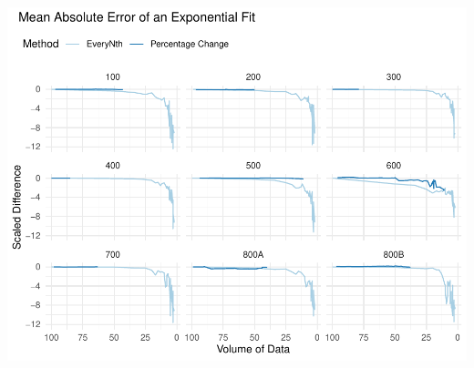 \documentclass{article}
\begin{document}
\includegraphics{210431461_CSC8639_Dissertation_files/figure-latex/MAE-1.pdf}
\end{document}
